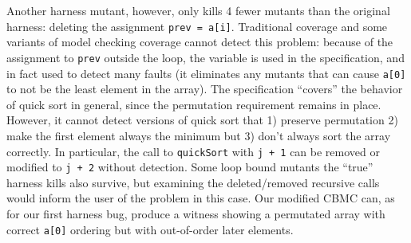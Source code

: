 \documentclass[conference]{IEEEtran}
\begin{document}
Another harness mutant, however, only kills 4 fewer mutants than the
original harness: deleting the assignment {\tt prev = a[i]}.
Traditional coverage and some variants of model checking coverage
cannot detect this problem: because of the assignment to {\tt prev}
outside the loop, the variable is used in the specification, and in
fact used to detect many faults (it eliminates any mutants that can
cause {\tt a[0]} to not be the least element in the array).  The
specification ``covers'' the behavior of quick sort in general, since
the permutation requirement remains in place.  However, it cannot detect
versions of quick sort that 1) preserve permutation 2) make the first
element always the minimum but 3) don't always sort the array correctly.  In
particular, the call to {\tt quickSort} with {\tt j + 1} can be
removed or modified to {\tt j + 2} without detection.  Some loop bound
mutants the ``true'' harness kills also survive, but examining the
deleted/removed recursive calls would inform the user of the problem
in this case.  Our modified CBMC can, as for our first harness bug,
produce a witness showing a permutated array with correct {\tt a[0]}
ordering but with out-of-order later elements.
\end{document}
